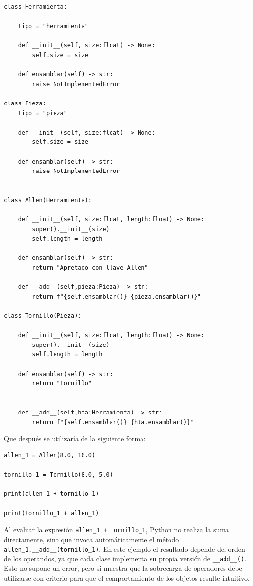 \documentclass[11pt,a5paper,twoside]{book}
\begin{document}
\begin{tcolorbox}
\scriptsize
 \begin{verbatim}
class Herramienta:

    tipo = "herramienta"
    
    def __init__(self, size:float) -> None:
        self.size = size

    def ensamblar(self) -> str:
        raise NotImplementedError

class Pieza:
    tipo = "pieza"

    def __init__(self, size:float) -> None:
        self.size = size

    def ensamblar(self) -> str:
        raise NotImplementedError


class Allen(Herramienta):

    def __init__(self, size:float, length:float) -> None:
        super().__init__(size)
        self.length = length

    def ensamblar(self) -> str:
        return "Apretado con llave Allen"

    def __add__(self,pieza:Pieza) -> str:
        return f"{self.ensamblar()} {pieza.ensamblar()}"

class Tornillo(Pieza):

    def __init__(self, size:float, length:float) -> None:
        super().__init__(size)
        self.length = length

    def ensamblar(self) -> str:
        return "Tornillo"

    
    def __add__(self,hta:Herramienta) -> str:
        return f"{self.ensamblar()} {hta.ensamblar()}"
\end{verbatim}
\end{tcolorbox}
Que después se utilizaría de la siguiente forma:


\begin{tcolorbox}
\scriptsize
 \begin{verbatim}
allen_1 = Allen(8.0, 10.0)

tornillo_1 = Tornillo(8.0, 5.0)

print(allen_1 + tornillo_1)

print(tornillo_1 + allen_1)
\end{verbatim}
\end{tcolorbox}
Al evaluar la expresión {\scriptsize \texttt{allen\_1 + tornillo\_1}}, Python no realiza la suma directamente, sino que invoca automáticamente el método {\scriptsize \texttt{allen\_1.\_\_add\_\_(tornillo\_1)}}.
En este ejemplo el resultado depende del orden de los operandos, ya que cada clase implementa su propia versión de {\scriptsize \texttt{\_\_add\_\_()}}. Esto no supone un error, pero sí muestra que la sobrecarga de operadores debe utilizarse con criterio para que el comportamiento de los objetos resulte intuitivo.
\end{document}
